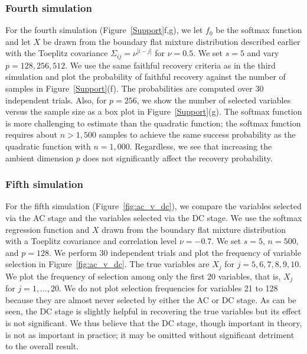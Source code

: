 \subsubsection{Fourth simulation}
For the \textrm{fourth simulation} (Figure~\ref{Support}f,g), we let
$f_0$ be the softmax function and let $X$ be drawn from the boundary
flat mixture distribution described earlier with the Toeplitz
covariance $\Sigma_{ij}=\nu^{|i-j|}$ for $\nu = 0.5$. We set $s=5$ and
vary $p=128,256,512$. We use the same faithful recovery criteria as in
the third simulation and plot the probability of faithful recovery
against the number of samples in Figure~\ref{Support}(f). The
probabilities are computed over 30 independent trials. Also, for
$p=256$, we show the number of selected variables versus the sample
size as a box plot in Figure~\ref{Support}(g). The softmax function is
more challenging to estimate than the quadratic function; the softmax
function requires about $n > 1{,}500$ samples to achieve the same success
probability as the quadratic function with $n=1{,}000$. Regardless, we
see that increasing the ambient dimension $p$ does not significantly
affect the recovery probability.


\subsubsection{Fifth simulation}
For the \textrm{fifth simulation} (Figure~\ref{fig:ac_v_dc}), we
compare the variables selected via the AC stage and the variables
selected via the DC stage. We use the softmax regression function and
$X$ drawn from the boundary flat mixture distribution with a Toeplitz
covariance and correlation level $\nu = -0.7$. We set $s=5$, $n=500$,
and $p=128$. We perform 30 independent trials and plot the frequency of
variable selection in Figure~\ref{fig:ac_v_dc}. The true variables are
$X_j$ for $j=5,6,7,8,9,10$. We plot the frequency of selection among
only the first 20 variables, that is, $X_j$ for $j=1,\ldots,20$. We do
not plot selection frequencies for variables 21 to 128 because they
are almost never selected by either the AC or DC stage. As can be
seen, the DC stage is slightly helpful in recovering the true
variables but its effect is not significant. We thus believe that the
DC stage, though important in theory, is not as important in practice;
it may be omitted without significant detriment to the overall result.

